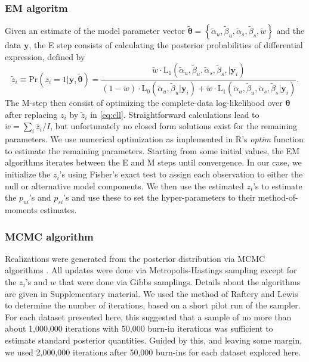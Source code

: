 \documentclass[11pt]{article}
\begin{document}
\subsubsection{EM algoritm}
Given an estimate of the model parameter vector $\tilde{\boldsymbol{\theta}}=\left\{\tilde{\alpha}_u,\tilde{\beta}_u,\tilde{\alpha}_s,\tilde{\beta}_s,\tilde{w}\right\}$ and the data $\mathbf{y}$, the E step consists of calculating the posterior probabilities of differential expression, defined by
\[
\tilde z_{i} \equiv \mathrm{Pr}(z_i=1|\mathbf{y},\tilde{\boldsymbol{\theta}})=\frac{\tilde{w} \cdot \mathrm{L}_1(\tilde{\alpha}_u,\tilde{\beta}_u,\tilde{\alpha}_s,\tilde{\beta}_s,|\mathbf{y}_i)}{(1-\tilde{w})\cdot\mathrm{L}_0(\tilde{\alpha}_u,\tilde{\beta}_u|\mathbf{y}_i)+\tilde{w}\cdot\mathrm{L}_1(\tilde{\alpha}_u,\tilde{\beta}_u,\tilde{\alpha}_s,\tilde{\beta}_s|\mathbf{y}_i)}.
\] 
The M-step then consist of optimizing the complete-data log-likelihood over $\boldsymbol{\theta}$ after replacing $z_i$ by $\tilde{z}_{i}$ in \eqref{eq:cll}. Straightforward calculations lead to 
$\tilde w = \sum_i{\tilde{z_i}}/I$, but unfortunately no closed form solutions exist for the remaining parameters. We use numerical optimization as implemented in R's \textit{optim} function to estimate the remaining parameters.  Starting from some initial values, the EM algorithms iterates between the E and M steps until convergence. In our case, we initialize the $z_{i}$'s using Fisher's exact test to assign each observation to either the null or alternative model components. We then use the estimated $z_i$'s to estimate the $p_{ui}$'s and $p_{si}$'s and use these to set the hyper-parameters to their method-of-moments estimates.

\subsubsection{MCMC algorithm}
Realizations were generated from the posterior distribution via MCMC algorithms \citep{Gelfand}. All updates were done via Metropolis-Hastings sampling except for the $z_i$'s and $w$ that were done via Gibbs samplings.
Details about the algorithms are given in Supplementary material. We used the method of Raftery and Lewis \citep{Raftery1,Raftery2} to determine the number of iterations, based on a short pilot run of the sampler. For each dataset presented here, this suggested that a sample of no more than about 1,000,000 iterations with 50,000 burn-in iterations was sufficient to estimate standard posterior quantities. Guided by this, and leaving some margin, we used 2,000,000 iterations after 50,000  burn-ins for each dataset explored here. 
\end{document}
